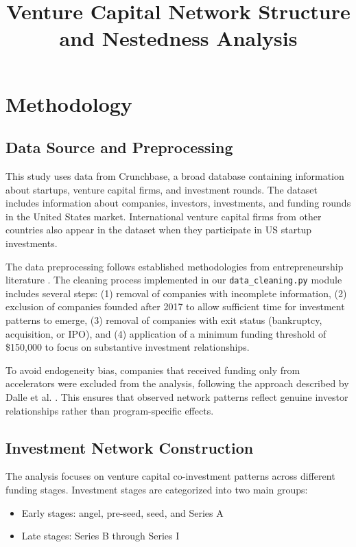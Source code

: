 \documentclass[12pt]{article}
\title{Venture Capital Network Structure and Nestedness Analysis}
\author{}
\date{}
\begin{document}
\maketitle

\section{Methodology}

\subsection{Data Source and Preprocessing}

This study uses data from Crunchbase, a broad database containing information about startups, venture capital firms, and investment rounds. The dataset includes information about companies, investors, investments, and funding rounds in the United States market. International venture capital firms from other countries also appear in the dataset when they participate in US startup investments.

The data preprocessing follows established methodologies from entrepreneurship literature \cite{Dalle2025}. The cleaning process implemented in our \texttt{data\_cleaning.py} module includes several steps: (1) removal of companies with incomplete information, (2) exclusion of companies founded after 2017 to allow sufficient time for investment patterns to emerge, (3) removal of companies with exit status (bankruptcy, acquisition, or IPO), and (4) application of a minimum funding threshold of \$150,000 to focus on substantive investment relationships.

To avoid endogeneity bias, companies that received funding only from accelerators were excluded from the analysis, following the approach described by Dalle et al. \cite{Dalle2025}. This ensures that observed network patterns reflect genuine investor relationships rather than program-specific effects.

\subsection{Investment Network Construction}

The analysis focuses on venture capital co-investment patterns across different funding stages. Investment stages are categorized into two main groups:
\begin{itemize}
    \item Early stages: angel, pre-seed, seed, and Series A
    \item Late stages: Series B through Series I
\end{itemize}
\end{document}
